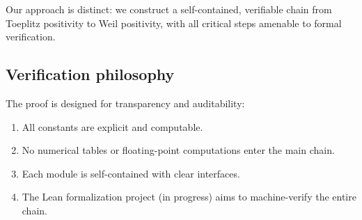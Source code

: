 \documentclass[11pt,a4paper]{article}
\theoremstyle{definition}
\begin{document}
Our approach is distinct: we construct a self-contained, verifiable chain from Toeplitz positivity to Weil positivity, with all critical steps amenable to formal verification.

\subsection{Verification philosophy}

The proof is designed for transparency and auditability:

\begin{enumerate}
\item All constants are explicit and computable.
\item No numerical tables or floating-point computations enter the main chain.
\item Each module is self-contained with clear interfaces.
\item The Lean formalization project (in progress) aims to machine-verify the entire chain.
\end{enumerate}

\end{document}
